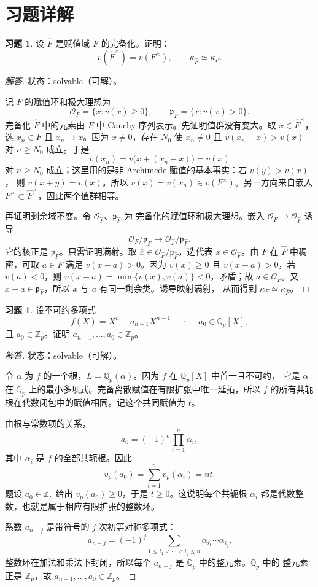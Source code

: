 \documentclass[11pt,a4paper,openany]{ctexbook}
\numberwithin{equation}{chapter}
\newcommand{\Q}{\mathbb{Q}}
\newcommand{\Z}{\mathbb{Z}}
\theoremstyle{plain}
\theoremstyle{definition}
\newtheorem{exercise}[theorem]{习题}
\theoremstyle{remark}
\begin{document}
\section*{习题详解}

\begin{exercise}
设 $\widehat F$ 是赋值域 $F$ 的完备化。证明：
\[
v(\widehat F^\times)=v(F^\times),\qquad
\kappa_{\widehat F}\simeq\kappa_F .
\]
\end{exercise}

\begin{proof}[解答]
状态：solvable（可解）。

记 $F$ 的赋值环和极大理想为
\[
\mathcal O_F=\{x:v(x)\ge0\},\qquad
\mathfrak p_F=\{x:v(x)>0\}.
\]
完备化 $\widehat F$ 中的元素由 $F$ 中 Cauchy 序列表示。先证明值群没有变大。取
$x\in\widehat F^\times$，选 $x_n\in F$ 且 $x_n\to x$。因为 $x\ne0$，存在 $N_0$
使 $x_n\ne0$ 且 $v(x_n-x)>v(x)$ 对 $n\ge N_0$ 成立。于是
\[
v(x_n)=v\bigl(x+(x_n-x)\bigr)=v(x)
\]
对 $n\ge N_0$ 成立；这里用的是非 Archimede 赋值的基本事实：若 $v(y)>v(x)$，
则 $v(x+y)=v(x)$。所以 $v(x)=v(x_n)\in v(F^\times)$。另一方向来自嵌入
$F^\times\subset\widehat F^\times$，因此两个值群相等。

再证明剩余域不变。令 $\mathcal O_{\widehat F}$、$\mathfrak p_{\widehat F}$ 为
完备化的赋值环和极大理想。嵌入 $\mathcal O_F\to\mathcal O_{\widehat F}$ 诱导
\[
\mathcal O_F/\mathfrak p_F\longrightarrow
\mathcal O_{\widehat F}/\mathfrak p_{\widehat F}.
\]
它的核正是 $\mathfrak p_F$。只需证明满射。取
$\bar x\in\mathcal O_{\widehat F}/\mathfrak p_{\widehat F}$，选代表
$x\in\mathcal O_{\widehat F}$。由 $F$ 在 $\widehat F$ 中稠密，可取 $a\in F$
满足 $v(x-a)>0$。因为 $v(x)\ge0$ 且 $v(x-a)>0$，若 $v(a)<0$，则
$v(x-a)=\min\{v(x),v(a)\}<0$，矛盾；故 $a\in\mathcal O_F$。又
$x-a\in\mathfrak p_{\widehat F}$，所以 $x$ 与 $a$ 有同一剩余类。诱导映射满射，
从而得到 $\kappa_F\simeq\kappa_{\widehat F}$。
\end{proof}

\begin{exercise}
设不可约多项式
\[
f(X)=X^n+a_{n-1}X^{n-1}+\cdots+a_0\in\Q_p[X],
\]
且 $a_0\in\Z_p$。证明 $a_{n-1},\dots,a_0\in\Z_p$。
\end{exercise}

\begin{proof}[解答]
状态：solvable（可解）。

令 $\alpha$ 为 $f$ 的一个根，$L=\Q_p(\alpha)$。因为 $f$ 在 $\Q_p[X]$ 中首一且不可约，
它是 $\alpha$ 在 $\Q_p$ 上的最小多项式。完备离散赋值在有限扩张中唯一延拓，所以
$f$ 的所有共轭根在代数闭包中的赋值相同。记这个共同赋值为 $t$。

由根与常数项的关系，
\[
a_0=(-1)^n\prod_{i=1}^n\alpha_i,
\]
其中 $\alpha_i$ 是 $f$ 的全部共轭根。因此
\[
v_p(a_0)=\sum_{i=1}^n v_p(\alpha_i)=nt .
\]
题设 $a_0\in\Z_p$ 给出 $v_p(a_0)\ge0$，于是 $t\ge0$。这说明每个共轭根
$\alpha_i$ 都是代数整数，也就是属于相应有限扩张的整数环。

系数 $a_{n-j}$ 是带符号的 $j$ 次初等对称多项式：
\[
a_{n-j}=(-1)^j\sum_{1\le i_1<\cdots<i_j\le n}
\alpha_{i_1}\cdots\alpha_{i_j}.
\]
整数环在加法和乘法下封闭，所以每个 $a_{n-j}$ 是 $\Q_p$ 中的整元素。$\Q_p$ 中的
整元素正是 $\Z_p$，故 $a_{n-1},\ldots,a_0\in\Z_p$。
\end{proof}
\end{document}
